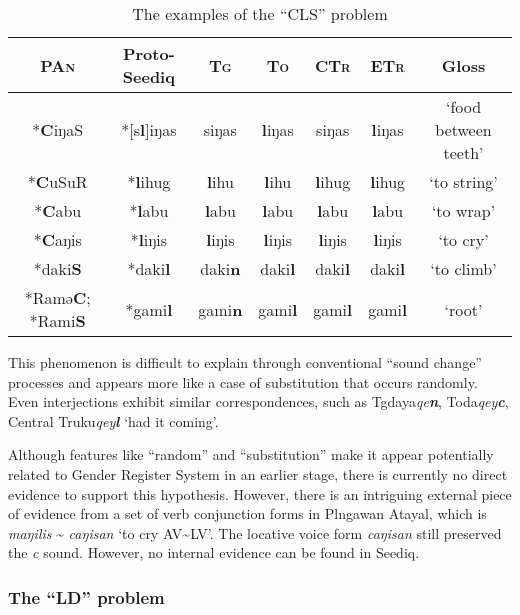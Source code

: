 \documentclass[12pt]{article}
\newcommand{\pan}{\textsc{PAn}\xspace}
\newcommand{\psedf}{Proto-Seediq\xspace}
\newcommand{\stg}{\textsc{Tg}\xspace}
\newcommand{\stgf}{Tgdaya\xspace}
\newcommand{\sto}{\textsc{To}\xspace}
\newcommand{\stof}{Toda\xspace}
\newcommand{\sctr}{\textsc{CTr}\xspace}
\newcommand{\sctrf}{Central Truku\xspace}
\newcommand{\setr}{\textsc{ETr}\xspace}
\begin{document}
\begin{table}[!htbp]
\centering
\caption{The examples of the ``CLS'' problem}
\label{tab:cls}
\begin{tabular}{ccccccc}
\hline
\pan           & \psedf    & \stg & \sto & \sctr & \setr & Gloss                \\ \hline
*\textbf{C}iŋaS         & *[s\textbf{l}]iŋas & siŋas & \textbf{l}iŋas & siŋas  & \textbf{l}iŋas  & `food between teeth' \\
*\textbf{C}uSuR         & *\textbf{l}ihug    & \textbf{l}ihu  & \textbf{l}ihu  & \textbf{l}ihug  & \textbf{l}ihug  & `to string'          \\
*\textbf{C}abu          & *\textbf{l}abu     & \textbf{l}abu  & \textbf{l}abu  & \textbf{l}abu   & \textbf{l}abu   & `to wrap'            \\
*\textbf{C}aŋis         & *\textbf{l}iŋis    & \textbf{l}iŋis & \textbf{l}iŋis & \textbf{l}iŋis  & \textbf{l}iŋis  & `to cry'             \\
*daki\textbf{S}         & *daki\textbf{l}    & daki\textbf{n} & daki\textbf{l} & daki\textbf{l}  & daki\textbf{l}  & `to climb'           \\
*Ramə\textbf{C}; *Rami\textbf{S} & *gami\textbf{l}    & gami\textbf{n} & gami\textbf{l} & gami\textbf{l}  & gami\textbf{l}  & `root'               \\ \hline
\end{tabular}
\end{table}

This phenomenon is difficult to explain through conventional ``sound change'' processes and appears more like a case of substitution that occurs randomly. Even interjections exhibit similar correspondences, such as \stgf \textit{qe\textbf{n}}, \stof \textit{qey\textbf{c}}, \sctrf \textit{qey\textbf{l}} `had it coming'.

Although features like ``random'' and ``substitution'' make it appear potentially related to Gender Register System in an earlier stage, there is currently no direct evidence to support this hypothesis. However, there is an intriguing external piece of evidence from a set of verb conjunction forms in Plngawan Atayal, which is \textit{maŋilis} \~{} \textit{caŋisan} `to cry AV\~{}LV'. The locative voice form \textit{caŋisan} still preserved the \textit{c} sound. However, no internal evidence can be found in Seediq. 

\subsubsection{The ``LD'' problem}
\end{document}
